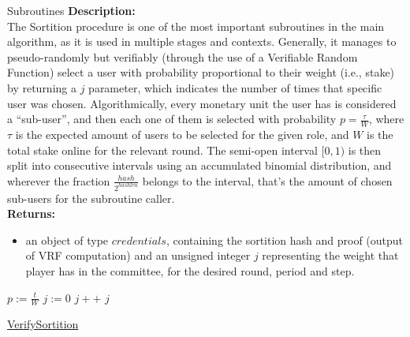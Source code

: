\documentclass[10pt,a4paper]{article}
\begin{document}
\begin{section}{Subroutines}
\noindent \textbf{Description:}\\
The Sortition procedure is one of the most important subroutines in the main algorithm, as it is 
used in multiple stages and contexts.
Generally, it manages to pseudo-randomly but verifiably (through the use of a Verifiable Random 
Function) select a user with probability proportional
to their weight (i.e., stake) by returning a $j$ parameter, which indicates the number of times that 
specific user was chosen.
Algorithmically, every monetary unit the user has is considered a ``sub-user'', and then each one 
of them is selected with probability $p = \frac{\tau}{W}$,
where $\tau$ is the expected amount of users to be selected for the given role, and $W$ is the total
stake online for the relevant round.
The semi-open interval $[0,1)$ is then split into consecutive intervals using an accumulated 
binomial distribution, and wherever the fraction $\frac{hash}{2^{hashlen}}$
belongs to the interval, that's the amount of chosen sub-users for the subroutine caller.\\

\noindent \textbf{Returns:}
\begin{itemize}
    \item an object of type $credentials$, containing the sortition hash and proof (output of VRF
    computation) and an unsigned integer $j$ representing the weight that player has in the committee,
    for the desired round, period and step.
  \end{itemize}



\begin{algorithm}[H]
    \begin{algorithmic}[1]
        \State $p := \frac{t}{W}$
        \State $j := 0$
        \While{$\frac{hash}{2^{hashlen}} \notin [\sum_{k=0}^j\mathsf{B}(k;w,p), \sum_{k=0}^{j+1}\mathsf{B}(k;w,p))$}
            \State $j++$
        \EndWhile
        \Return $j$
    \EndFunction
    \end{algorithmic}
    \caption{\underline{VerifySortition}}
\end{algorithm}


\end{section}
\end{document}
